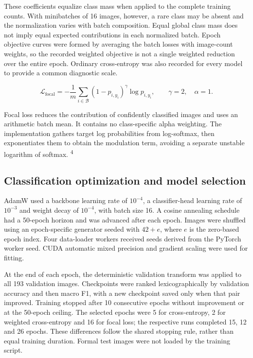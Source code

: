 \documentclass[11pt,a4paper]{article}
\begin{document}
These coefficients equalize class mass when applied to the complete training counts. With minibatches of 16 images, however, a rare class may be absent and the normalization varies with batch composition. Equal global class mass does not imply equal expected contributions in each normalized batch. Epoch objective curves were formed by averaging the batch losses with image-count weights, so the recorded weighted objective is not a single weighted reduction over the entire epoch. Ordinary cross-entropy was also recorded for every model to provide a common diagnostic scale.




\begin{equation}
\label{eq:classification-focal}
\mathcal{L}_{\mathrm{focal}}=-\frac{1}{m}\sum_{i\in\mathcal{B}}(1-p_{i,y_i})^{\gamma}\log p_{i,y_i},\qquad \gamma=2,\quad \alpha=1.
\end{equation}


Focal loss reduces the contribution of confidently classified images and uses an arithmetic batch mean. It contains no class-specific alpha weighting. The implementation gathers target log probabilities from log-softmax, then exponentiates them to obtain the modulation term, avoiding a separate unstable logarithm of softmax. \textsuperscript{4}



\subsection*{Classification optimization and model selection}

AdamW used a backbone learning rate of $10^{-4}$, a classifier-head learning rate of $10^{-3}$ and weight decay of $10^{-4}$, with batch size 16. A cosine annealing schedule had a 50-epoch horizon and was advanced after each epoch. Images were shuffled using an epoch-specific generator seeded with $42+e$, where $e$ is the zero-based epoch index. Four data-loader workers received seeds derived from the PyTorch worker seed. CUDA automatic mixed precision and gradient scaling were used for fitting.



At the end of each epoch, the deterministic validation transform was applied to all 193 validation images. Checkpoints were ranked lexicographically by validation accuracy and then macro F1, with a new checkpoint saved only when that pair improved. Training stopped after 10 consecutive epochs without improvement or at the 50-epoch ceiling. The selected epochs were 5 for cross-entropy, 2 for weighted cross-entropy and 16 for focal loss; the respective runs completed 15, 12 and 26 epochs. These differences follow the shared stopping rule, rather than equal training duration. Formal test images were not loaded by the training script.
\end{document}
